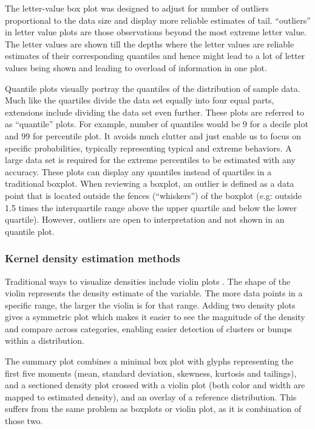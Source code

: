 \documentclass[12pt]{article}
\begin{document}
The letter-value box plot \citep[2006]{Hofmann2017-sg} was designed to
adjust for number of outliers proportional to the data size and display
more reliable estimates of tail. ``outliers'' in letter value plots are
those observations beyond the most extreme letter value. The letter
values are shown till the depths where the letter values are reliable
estimates of their corresponding quantiles and hence might lead to a lot
of letter values being shown and leading to overload of information in
one plot.

Quantile plots visually portray the quantiles of the distribution of
sample data. Much like the quartiles divide the data set equally into
four equal parts, extensions include dividing the data set even further.
These plots are referred to as ``quantile'' plots. For example, number
of quantiles would be 9 for a decile plot and 99 for percentile plot. It
avoids much clutter and just enable us to focus on specific
probabilities, typically representing typical and extreme behaviors. A
large data set is required for the extreme percentiles to be estimated
with any accuracy. These plots can display any quantiles instead of
quartiles in a traditional boxplot. When reviewing a boxplot, an outlier
is defined as a data point that is located outside the fences
(``whiskers'') of the boxplot (e.g: outside 1.5 times the interquartile
range above the upper quartile and below the lower quartile). However,
outliers are open to interpretation and not shown in an quantile plot.

\hypertarget{kernel-density-estimation-methods}{%
\subsubsection{Kernel density estimation
methods}\label{kernel-density-estimation-methods}}

Traditional ways to visualize densities include violin plots
\citep[1998]{Hintze1998-zi}. The shape of the violin represents the
density estimate of the variable. The more data points in a specific
range, the larger the violin is for that range. Adding two density plots
gives a symmetric plot which makes it easier to see the magnitude of the
density and compare across categories, enabling easier detection of
clusters or bumps within a distribution.

The summary plot \citep[2010]{Potter2010-qc} combines a minimal box plot
with glyphs representing the first five moments (mean, standard
deviation, skewness, kurtosis and tailings), and a sectioned density
plot crossed with a violin plot (both color and width are mapped to
estimated density), and an overlay of a reference distribution. This
suffers from the same problem as boxplots or violin plot, as it is
combination of those two.
\end{document}
